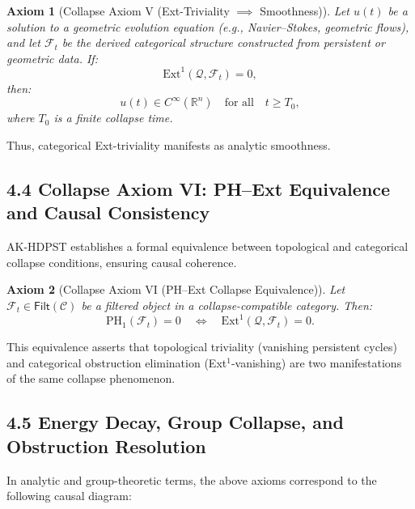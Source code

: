 \documentclass[11pt]{article}
\newtheorem{axiom}{Axiom}[section]
\begin{document}
\begin{axiom}[Collapse Axiom V (Ext-Triviality $\implies$ Smoothness)]
Let \( u(t) \) be a solution to a geometric evolution equation (e.g., Navier–Stokes, geometric flows),  
and let \( \mathcal{F}_t \) be the derived categorical structure constructed from persistent or geometric data.  
If:
\[
\mathrm{Ext}^1(\mathcal{Q}, \mathcal{F}_t) = 0,
\]
then:
\[
u(t) \in C^\infty(\mathbb{R}^n) \quad \text{for all} \quad t \geq T_0,
\]
where \( T_0 \) is a finite collapse time.
\end{axiom}

Thus, categorical Ext-triviality manifests as analytic smoothness.

\subsection*{4.4 Collapse Axiom VI: PH–Ext Equivalence and Causal Consistency}

AK-HDPST establishes a formal equivalence between topological and categorical collapse conditions, ensuring causal coherence.

\begin{axiom}[Collapse Axiom VI (PH–Ext Collapse Equivalence)]
Let \( \mathcal{F}_t \in \mathsf{Filt}(\mathcal{C}) \) be a filtered object in a collapse-compatible category. Then:
\[
\mathrm{PH}_1(\mathcal{F}_t) = 0 \quad \Longleftrightarrow \quad \mathrm{Ext}^1(\mathcal{Q}, \mathcal{F}_t) = 0.
\]
\end{axiom}

This equivalence asserts that topological triviality (vanishing persistent cycles) and categorical obstruction elimination (Ext$^1$-vanishing) are two manifestations of the same collapse phenomenon.

\subsection*{4.5 Energy Decay, Group Collapse, and Obstruction Resolution}

In analytic and group-theoretic terms, the above axioms correspond to the following causal diagram:

\end{document}
